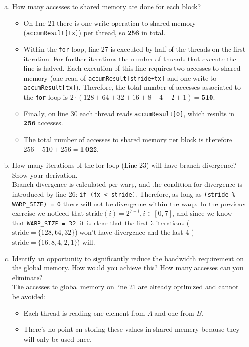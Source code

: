 \documentclass{article}
\begin{document}
\begin{enumerate}[1.]
\begin{enumerate}[(a)]
	    \item How many accesses to shared memory are done for each block?
	    \begin{itemize}
	        \item On line 21 there is one write operation to shared memory (\texttt{accumResult[tx]}) per thread, so $\mathbf{256}$ in total.
	        \item Within the \texttt{for} loop, line 27 is executed by half of the threads on the first iteration. For further iterations the number of threads that execute the line is halved. Each execution of this line requires two accesses to shared memory (one read of \texttt{accumResult[stride+tx]} and one write to \texttt{accumResult[tx]}). Therefore, the total number of accesses associated to the \texttt{for} loop is $2\cdot(128+64+32+16+8+4+2+1) = \mathbf{510}$.
	        \item Finally, on line 30 each thread reads \texttt{accumResult[0]}, which results in $\mathbf{256}$ accesses.
	        \item The total number of accesses to shared memory per block is therefore $256 + 510 + 256 = \mathbf{1\,022}$.
	    \end{itemize}
	    \item How many iterations of the for loop (Line 23) will have branch divergence? Show your derivation.\\
	    Branch divergence is calculated per warp, and the condition for divergence is introduced by line 26: \texttt{if (tx < stride)}. Therefore, as long as \texttt{(stride \% WARP\_SIZE) = 0} there will not be divergence within the warp. In the previous exercise we noticed that $\text{stride}(i) = 2^{7-i}, i \in [0,7]$, and since we know that \texttt{WARP\_SIZE = 32}, it is clear that the first 3 iterations ($\text{stride} = \{128, 64, 32\}$) won't have divergence and the last 4 ($\text{stride} = \{16, 8, 4, 2, 1\}$) will.
	    \item Identify an opportunity to significantly reduce the bandwidth requirement on
        the global memory. How would you achieve this? How many accesses can you eliminate?\\
        The accesses to global memory on line 21 are already optimized and cannot be avoided: 
        \begin{itemize}
            \item Each thread is reading one element from $A$ and one from $B$.
            \item There's no point on storing these values in shared memory because they will only be used once.

\end{itemize}
\end{enumerate}
\end{enumerate}
\end{document}
